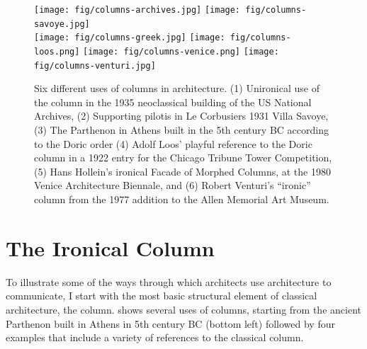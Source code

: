 \begin{figure}[t]
\vspace{-1em}
\texttt{[image: fig/columns-archives.jpg]}\quad
\texttt{[image: fig/columns-savoye.jpg]}\quad\\[1em]
\texttt{[image: fig/columns-greek.jpg]}\quad
\texttt{[image: fig/columns-loos.png]}\quad
\texttt{[image: fig/columns-venice.png]}\quad
\texttt{[image: fig/columns-venturi.jpg]}
\caption{Six different uses of columns in architecture. (1) Unironical use of the column in the 1935
neoclassical building of the US National Archives, (2) Supporting pilotis in Le Corbusiers 1931
Villa Savoye, (3) The Parthenon in Athens built in the 5th century BC according to the Doric order
(4) Adolf Loos' playful reference to the Doric column in a 1922 entry for the Chicago Tribune
Tower Competition, (5) Hans Hollein's ironical Facade of Morphed Columns, at the 1980 Venice
Architecture Biennale, and (6) Robert Venturi's ``ironic'' column from the 1977 addition to the
Allen Memorial Art Museum.}
\label{fig:columns}
\vspace{-1em}
\end{figure}

\section{The Ironical Column}
To illustrate some of the ways through which architects use architecture to communicate, I start
with the most basic structural element of classical architecture, the column. 
shows several uses of columns, starting from the ancient Parthenon built in Athens in 5th century
BC (bottom left) followed by four examples that include a variety of references to the classical
column.

\newpage

